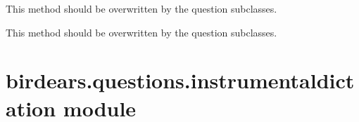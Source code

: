 \documentclass[letterpaper,10pt,english]{sphinxmanual}
\begin{document}
\begin{fulllineitems}
\begin{fulllineitems}
\end{fulllineitems}


\begin{fulllineitems}
\label{\detokenize{index:birdears.questions.harmonicinterval.HarmonicIntervalQuestion.make_resolution}}
This method should be overwritten by the question subclasses.

\end{fulllineitems}


\begin{fulllineitems}
\label{\detokenize{index:birdears.questions.harmonicinterval.HarmonicIntervalQuestion.play_question}}
This method should be overwritten by the question subclasses.

\end{fulllineitems}


\begin{fulllineitems}
\label{\detokenize{index:birdears.questions.harmonicinterval.HarmonicIntervalQuestion.play_resolution}}
\end{fulllineitems}


\end{fulllineitems}



\section{birdears.questions.instrumentaldictation module}
\label{\detokenize{index:birdears-questions-instrumentaldictation-module}}\label{\detokenize{index:module-birdears.questions.instrumentaldictation}}
\end{document}

